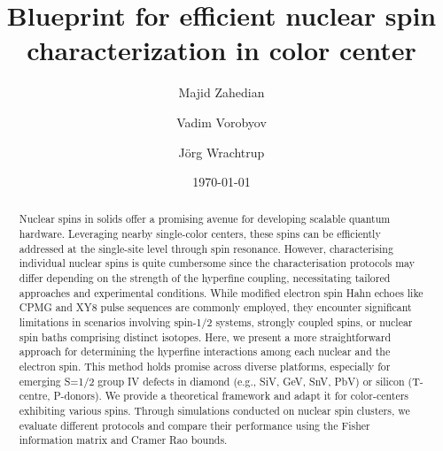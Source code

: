 \documentclass[%
 reprint,
superscriptaddress,
 amsmath,amssymb,
 aps,
]{revtex4-2}
\begin{document}

\title{Blueprint for efficient nuclear spin characterization in  color center}%

\author{Majid Zahedian}


\author{Vadim Vorobyov}

 
\author{J\"org Wrachtrup}

\date{\today}%

\begin{abstract}
Nuclear spins in solids offer a promising avenue for developing scalable quantum hardware. 
Leveraging nearby single-color centers, these spins can be efficiently addressed at the single-site level through spin resonance.
However, characterising individual nuclear spins is quite cumbersome since the characterisation protocols may differ depending on the strength of the hyperfine coupling, necessitating tailored approaches and experimental conditions.
While modified electron spin Hahn echoes like CPMG and XY8 pulse sequences are commonly employed, they encounter significant limitations in scenarios involving spin-1/2 systems, strongly coupled spins, or nuclear spin baths comprising distinct isotopes.
Here, we present a more straightforward approach for determining the hyperfine interactions among each nuclear and the electron spin. 
This method holds promise across diverse platforms, especially for emerging S=1/2 group IV defects in diamond (e.g., SiV, GeV, SnV, PbV) or silicon (T-centre, P-donors). 
We provide a theoretical framework and adapt it for color-centers exhibiting various spins. Through simulations conducted on nuclear spin clusters, we evaluate different protocols and compare their performance using the Fisher information matrix and Cramer Rao bounds.
\end{abstract}
\end{document}
